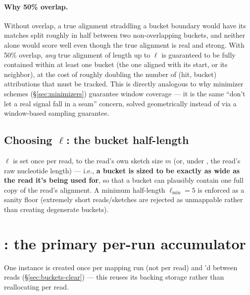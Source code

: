 \paragraph{Why 50\% overlap.} Without overlap, a true alignment straddling a bucket boundary would
have its matches split roughly in half between two non-overlapping buckets, and neither alone
would score well even though the true alignment is real and strong. With 50\% overlap, \emph{any}
true alignment of length up to $\ell$ is guaranteed to be fully contained within at least one
bucket (the one aligned with its start, or its neighbor), at the cost of roughly doubling the
number of (hit, bucket) attributions that must be tracked. This is directly analogous to why
minimizer schemes (\S\ref{sec:minimizers}) guarantee window coverage --- it is the same
``don't let a real signal fall in a seam'' concern, solved geometrically instead of via a
window-based sampling guarantee.

\subsection{Choosing $\ell$: the bucket half-length}
\label{sec:bucket-halflen}

$\ell$ is set once per read, to the read's own sketch size $m$ (or, under , the
read's raw nucleotide length) --- i.e., \textbf{a bucket is sized to be exactly as wide as the
read it's being used for}, so that a bucket can plausibly contain one full copy of the read's
alignment. A minimum half-length $\ell_{\min}=5$ is enforced as a sanity floor (extremely short
reads/sketches are rejected as unmappable rather than creating degenerate buckets).

\section{: the primary per-run accumulator}
\label{sec:buckets-struct}

One  instance is created once per mapping run (not per read) and 'd
between reads (\S\ref{sec:buckets-clear}) --- this reuses its backing storage rather than
reallocating per read.

